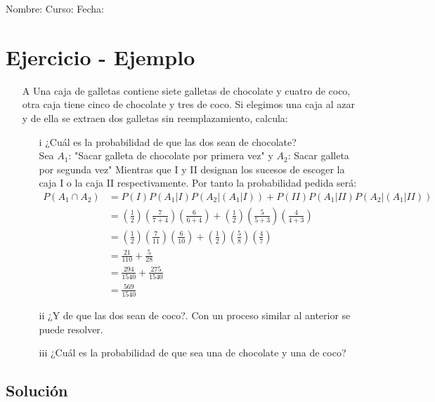 \documentclass[fleqn]{article}
\newcommand{\LineaNombre}{%
\par
\vspace{\baselineskip}
Nombre:\hrulefill \; Curso: \underline{\hspace*{36pt}} \; Fecha: \underline{\hspace*{2.5cm}} \relax
\par}
\begin{document}
\LineaNombre
\section*{Ejercicio - Ejemplo}
\begin{enumerate}
\item[A] Una caja de galletas contiene siete galletas de chocolate y cuatro de coco, otra caja tiene cinco de chocolate y tres de coco. Si elegimos una caja al azar y de ella se extraen dos galletas sin reemplazamiento, calcula:
\begin{enumerate}
\item[i] ¿Cuál es la probabilidad de que las dos sean de chocolate?\\

Sea $A_{1}$: "Sacar galleta de chocolate por primera vez" y $A_{2}$: Sacar galleta por segunda vez" Mientras que I y II designan los sucesos de escoger la caja I o la caja II respectivamente. Por tanto la probabilidad pedida será:
\begin{align*}
P(A_{1}\cap A_{2})&=P(I)P(A_{1}|I)P(A_{2}|(A_{1}|I))+P(II)P(A_{1}|II)P(A_{2}|(A_{1}|II))\\
&=\left(\frac{1}{2}\right)\left(\frac{7}{7+4}\right)\left(\frac{6}{6+4}\right)+\left(\frac{1}{2}\right)\left(\frac{5}{5+3}\right)\left(\frac{4}{4+3}\right)\\
&=\left(\frac{1}{2}\right)\left(\frac{7}{11}\right)\left(\frac{6}{10}\right)+\left(\frac{1}{2}\right)\left(\frac{5}{8}\right)\left(\frac{4}{7}\right)\\
&=\frac{21}{110}+\frac{5}{28}\\
&=\frac{294}{1540}+\frac{275}{1540}\\
&=\frac{569}{1540}
\end{align*}
\item[ii] ¿Y de que las dos sean de coco?. Con un proceso similar al anterior se puede resolver.
\item[iii] ¿Cuál es la probabilidad de que sea una de chocolate y una de coco?
\end{enumerate}
\end{enumerate}
\subsection*{Soluci\'on}
\end{document}

